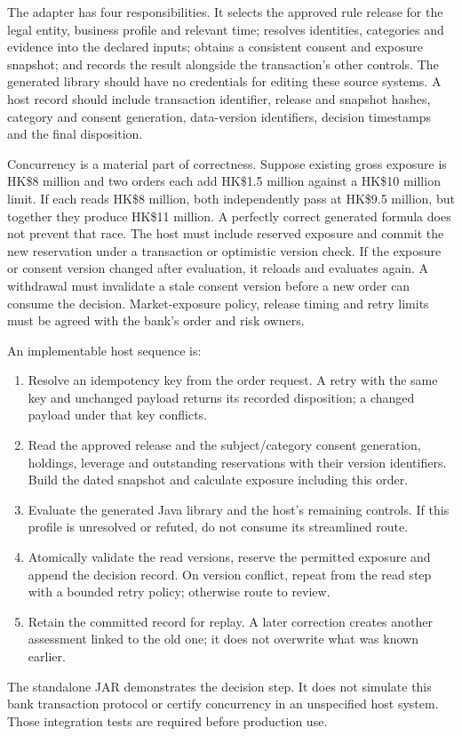 The adapter has four responsibilities. It selects the approved rule release for
the legal entity, business profile and relevant time; resolves identities,
categories and evidence into the declared inputs; obtains a consistent consent
and exposure snapshot; and records the result alongside the transaction's other
controls. The generated library should have no credentials for editing these
source systems. A host record should include transaction identifier, release and
snapshot hashes, category and consent generation, data-version identifiers,
decision timestamps and the final disposition.

Concurrency is a material part of correctness. Suppose existing gross exposure
is HK\$8 million and two orders each add HK\$1.5 million against a HK\$10 million
limit. If each reads HK\$8 million, both independently pass at HK\$9.5 million,
but together they produce HK\$11 million. A perfectly correct generated formula
does not prevent that race. The host must include reserved exposure and commit
the new reservation under a transaction or optimistic version check. If the
exposure or consent version changed after evaluation, it reloads and evaluates
again. A withdrawal must invalidate a stale consent version before a new order
can consume the decision. Market-exposure policy, release timing and retry limits
must be agreed with the bank's order and risk owners.


An implementable host sequence is:
\begin{enumerate}
\item Resolve an idempotency key from the order request. A retry with the same
key and unchanged payload returns its recorded disposition; a changed payload
under that key conflicts.
\item Read the approved release and the subject/category consent generation,
holdings, leverage and outstanding reservations with their version identifiers.
Build the dated snapshot and calculate exposure including this order.
\item Evaluate the generated Java library and the host's remaining controls.
If this profile is unresolved or refuted, do not consume its streamlined route.
\item Atomically validate the read versions, reserve the permitted exposure and
append the decision record. On version conflict, repeat from the read step with
a bounded retry policy; otherwise route to review.
\item Retain the committed record for replay. A later correction creates another
assessment linked to the old one; it does not overwrite what was known earlier.
\end{enumerate}
The standalone JAR demonstrates the decision step. It does not simulate this
bank transaction protocol or certify concurrency in an unspecified host system.
Those integration tests are required before production use.

